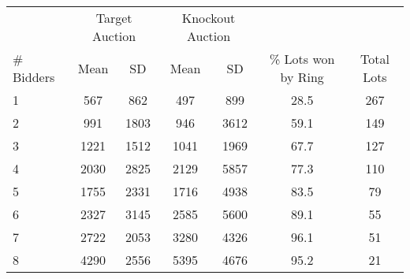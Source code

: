 \begin{tabular}{lcccccc}
\toprule
& \multicolumn{2}{c}{Target Auction} & \multicolumn{2}{c}{Knockout Auction} & & \\
\cmidrule(lr){2-3}\cmidrule(lr){4-5}
\# Bidders & Mean & SD & Mean & SD & \% Lots won by Ring & Total Lots \\ \midrule
1 & 567 & 862 & 497 & 899 & 28.5 & 267 \\
2 & 991 & 1803 & 946 & 3612 & 59.1 & 149 \\
3 & 1221 & 1512 & 1041 & 1969 & 67.7 & 127 \\
4 & 2030 & 2825 & 2129 & 5857 & 77.3 & 110 \\
5 & 1755 & 2331 & 1716 & 4938 & 83.5 & 79 \\
6 & 2327 & 3145 & 2585 & 5600 & 89.1 & 55 \\
7 & 2722 & 2053 & 3280 & 4326 & 96.1 & 51 \\
8 & 4290 & 2556 & 5395 & 4676 & 95.2 & 21 \\
\bottomrule
\end{tabular}
